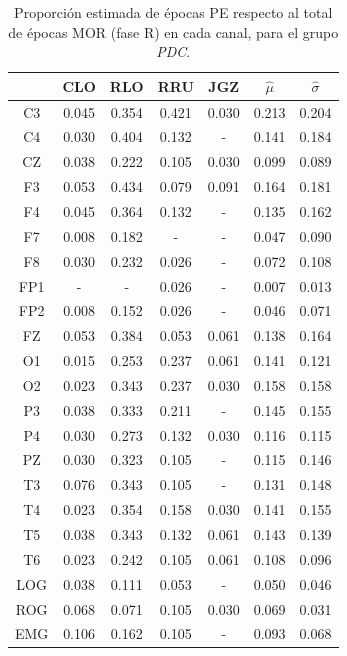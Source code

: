 \begin{table}
\centering
\begin{tabular}{c|cccc|cc}
& CLO & RLO & RRU & JGZ & $\widehat{\mu}$ & $\widehat{\sigma}$ \\
\hline
 C3 &0.045    &0.354    &0.421    &0.030    &0.213    &0.204     \\
 C4 &0.030    &0.404    &0.132    &-    &0.141    &0.184     \\
 CZ &0.038    &0.222    &0.105    &0.030    &0.099    &0.089    \\ 
 F3 &0.053    &0.434    &0.079    &0.091    &0.164    &0.181     \\
 F4 &0.045    &0.364    &0.132    &-    &0.135    &0.162     \\
 F7 &0.008    &0.182    &-    &-    &0.047    &0.090     \\
 F8 &0.030    &0.232    &0.026    &-    &0.072    &0.108    \\ 
 FP1 &-    &-    &0.026    &-    &0.007    &0.013     \\
 FP2 &0.008    &0.152    &0.026    &-    &0.046    &0.071     \\
 FZ &0.053    &0.384    &0.053    &0.061    &0.138    &0.164     \\
 O1 &0.015    &0.253    &0.237    &0.061    &0.141    &0.121     \\
 O2 &0.023    &0.343    &0.237    &0.030    &0.158    &0.158     \\
 P3 &0.038    &0.333    &0.211    &-    &0.145    &0.155     \\
 P4 &0.030    &0.273    &0.132    &0.030    &0.116    &0.115    \\ 
 PZ &0.030    &0.323    &0.105    &-    &0.115    &0.146     \\
 T3 &0.076    &0.343    &0.105    &-    &0.131    &0.148     \\
 T4 &0.023    &0.354    &0.158    &0.030    &0.141    &0.155     \\
 T5 &0.038    &0.343    &0.132    &0.061    &0.143    &0.139     \\
 T6 &0.023    &0.242    &0.105    &0.061    &0.108    &0.096     \\
 LOG &0.038    &0.111    &0.053    &-    &0.050    &0.046     \\
 ROG &0.068    &0.071    &0.105    &0.030    &0.069    &0.031    \\ 
 EMG &0.106    &0.162    &0.105    &-    &0.093    &0.068    
\end{tabular}
\caption{Proporci\'on estimada de \'epocas PE respecto al total de \'epocas
MOR (fase R) en cada
canal, para el grupo \textit{PDC}.}
\label{gpo_mn_mor}
\end{table}

